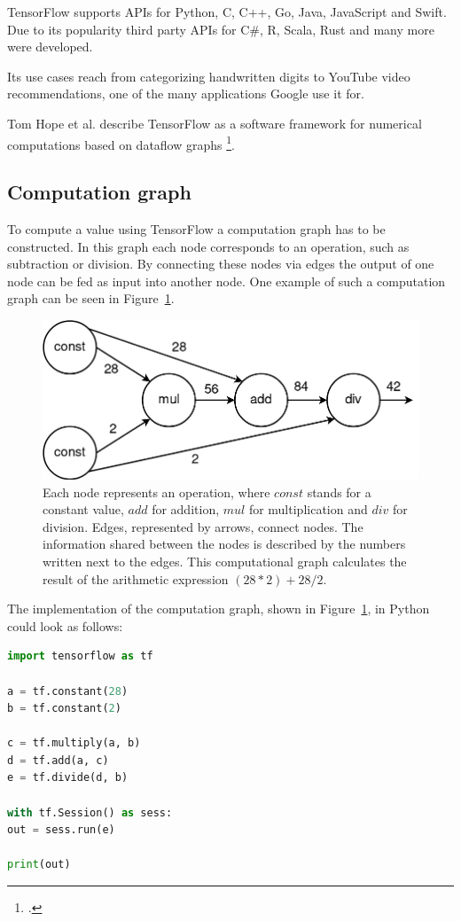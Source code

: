 TensorFlow supports APIs for Python, C, C++, Go, Java, JavaScript and Swift.
Due to its popularity third party APIs for C\#, R, Scala, Rust and many more were developed.

Its use cases reach from categorizing handwritten digits to YouTube video recommendations, one of the many applications Google use it for.

Tom Hope et al. describe TensorFlow as a software framework for numerical computations based on dataflow graphs \footcite[page 6]{Hope_Learning_TensorFlow}.

\subsection{Computation graph}
To compute a value using TensorFlow a computation graph has to be constructed. In this graph each node corresponds to an operation, such as subtraction or division. By connecting these nodes via edges the output of one node can be fed as input into another node. One example of such a computation graph can be seen in Figure~\ref{pic:methodology_tensorflow_computationGraph}.

\begin{figure}[h!]
	\centering
	\includegraphics[width=4.5in]{img/methodology_tensorflow_computationGraph.png}
	\caption{Each node represents an operation, where $const$ stands for a constant value, $add$ for addition, $mul$ for multiplication and $div$ for division. Edges, represented by arrows, connect nodes. The information shared between the nodes is described by the numbers written next to the edges. This computational graph calculates the result of the arithmetic expression $(28 * 2) + 28 / 2$.}
	\label{pic:methodology_tensorflow_computationGraph}
\end{figure}

The implementation of the computation graph, shown in Figure~\ref{pic:methodology_tensorflow_computationGraph}, in Python could look as follows:

\begin{lstlisting}[language=python]
import tensorflow as tf

a = tf.constant(28)
b = tf.constant(2)

c = tf.multiply(a, b)
d = tf.add(a, c)
e = tf.divide(d, b)

with tf.Session() as sess:
out = sess.run(e)

print(out)
\end{lstlisting}

